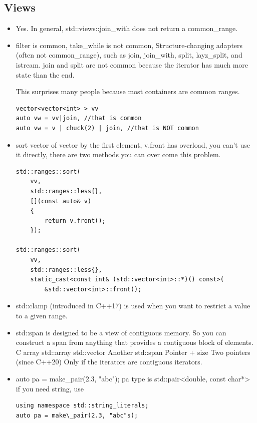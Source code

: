 \documentclass[a4paper,11pt,twoside]{book}
\begin{document}
\subsection{Views}
\begin{itemize}
	\item Yes. In general, std::views::join\_with does not return a common\_range.
	
	\item filter is common, take\_while is not common, Structure-changing adapters (often not common\_range), such as join, join\_with, split, layz\_split, and istream. join and split are not common because the iterator has much more state than the end.
	
	This surprises many people because most containers are common ranges.
	
\begin{lstlisting}
vector<vector<int> > vv
auto vw = vv|join, //that is common
auto vw = v | chuck(2) | join, //that is NOT common
\end{lstlisting}

	\item sort vector of vector by the first element, v.front has overload, you can't use it directly, there are two methods you can over come this problem. 
	
\begin{lstlisting}
std::ranges::sort(
    vv,
    std::ranges::less{},
    [](const auto& v)
    {
        return v.front();
    });
    
std::ranges::sort(
    vv,
    std::ranges::less{},
    static_cast<const int& (std::vector<int>::*)() const>(
        &std::vector<int>::front));
\end{lstlisting}


	\item std::clamp (introduced in C++17) is used when you want to restrict a value to a given range.

	\item std::span is designed to be a view of contiguous memory. So you can construct a span from anything that provides a contiguous block of elements. C array  std::array std::vector Another std::span Pointer + size
	Two pointers (since C++20) Only if the iterators are contiguous iterators.
	
	\item auto pa = make\_pair(2.3, "abc"); pa type is std::pair<double, const char*> if you need string, use 
	
\begin{lstlisting}
using namespace std::string_literals;
auto pa = make\_pair(2.3, "abc"s);
\end{lstlisting}


\end{itemize}
\end{document}
